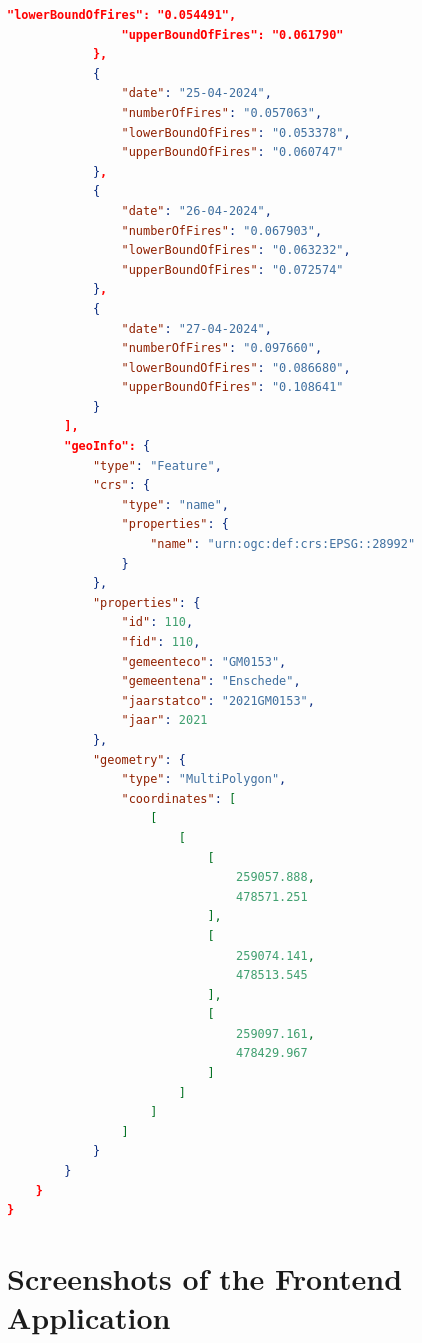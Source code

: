 \documentclass{utitcphd_overleaf}
\begin{document}
\begin{lstlisting}[label={lst:api_2_response}, language=json, caption=Example API Response in Milestone 2]
                "lowerBoundOfFires": "0.054491",
                "upperBoundOfFires": "0.061790"
            },
            {
                "date": "25-04-2024",
                "numberOfFires": "0.057063",
                "lowerBoundOfFires": "0.053378",
                "upperBoundOfFires": "0.060747"
            },
            {
                "date": "26-04-2024",
                "numberOfFires": "0.067903",
                "lowerBoundOfFires": "0.063232",
                "upperBoundOfFires": "0.072574"
            },
            {
                "date": "27-04-2024",
                "numberOfFires": "0.097660",
                "lowerBoundOfFires": "0.086680",
                "upperBoundOfFires": "0.108641"
            }
        ],
        "geoInfo": {
            "type": "Feature",
            "crs": {
                "type": "name",
                "properties": {
                    "name": "urn:ogc:def:crs:EPSG::28992"
                }
            },
            "properties": {
                "id": 110,
                "fid": 110,
                "gemeenteco": "GM0153",
                "gemeentena": "Enschede",
                "jaarstatco": "2021GM0153",
                "jaar": 2021
            },
            "geometry": {
                "type": "MultiPolygon",
                "coordinates": [
                    [
                        [
                            [
                                259057.888,
                                478571.251
                            ],
                            [
                                259074.141,
                                478513.545
                            ],
                            [
                                259097.161,
                                478429.967
                            ]
                        ]
                    ]
                ]
            }
        }
    }
}
\end{lstlisting}

\chapter{Screenshots of the Frontend Application}
\label{app:additionaldata}



\listoffigures
\listoftables



  
\end{document}
